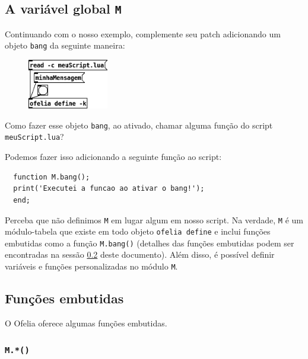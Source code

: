 \documentclass{article}
\begin{document}
\subsection{A variável global \texttt{M}}

Continuando com o nosso exemplo, complemente seu patch adicionando um objeto \texttt{bang} da seguinte maneira:

\begin{figure}[H]
  \centering
  \includegraphics[width=100pt]{passo2.png}
\end{figure}

Como fazer esse objeto \texttt{bang}, ao ativado, chamar alguma função do script \texttt{meuScript.lua}?

Podemos fazer isso adicionando a seguinte função ao script:

\begin{center}
  \begin{lstlisting}
  function M.bang();
  print('Executei a funcao ao ativar o bang!');
  end;
  \end{lstlisting}
\end{center}

Perceba que não definimos \texttt{M} em lugar algum em nosso script.
Na verdade, \texttt{M} é um módulo-tabela que existe em todo objeto \texttt{ofelia define} e inclui funções embutidas como a função \texttt{M.bang()} (detalhes das funções embutidas podem ser encontradas na sessão \ref{subsection:funcoes-embutidas} deste documento).
Além disso, é possível definir variáveis e funções personalizadas no módulo \texttt{M}.

\subsection{Funções embutidas}\label{subsection:funcoes-embutidas}

O Ofelia oferece algumas funções embutidas.

\subsubsection{\texttt{M.*()}}
\end{document}
